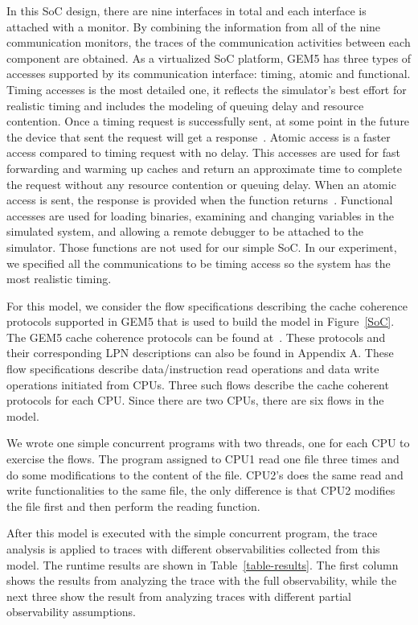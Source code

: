 \documentclass[12pt,frontmatter,copyright,thesis]{usfmanus}
\begin{document}
In this SoC design, there are nine interfaces in total and each 
interface is attached with a monitor.
 By combining the information from all of the nine communication monitors, 
 the traces of the communication activities between each component
 are obtained.
As a virtualized SoC platform, GEM5 has three types of accesses supported by
its communication interface:
timing, atomic and functional.
Timing accesses is the most detailed one,
it reflects the simulator's best effort for realistic timing
and includes the modeling of queuing delay and resource contention.
Once a timing request is successfully sent,
at some point in the future the device that sent the request will get a response~\cite{gem5}. 
Atomic access is a faster access compared to timing request with no delay.  
This accesses are used for fast forwarding and warming up caches and return an approximate time to complete the request without any resource contention or queuing delay.
When an atomic access is sent,
the response is provided when the function returns~\cite{gem5}.
Functional accesses are used for loading binaries, examining and changing variables in the simulated system,
and allowing a remote debugger to be attached to the simulator.
Those functions are not used for
our simple SoC.
In our experiment, we specified all the communications to be timing access
so the system has 
the most realistic timing.


For this model, we consider the flow specifications
describing the cache coherence protocols supported in
GEM5 that is used to build the model in Figure~\ref{SoC}.
The GEM5 cache coherence protocols can be found at~\cite{gem5}.
These protocols and their corresponding LPN descriptions can also be found
in Appendix A.
These flow specifications describe data/instruction read
operations and data write operations initiated from CPUs.
Three such flows describe the cache coherent protocols for
each CPU.  Since there are two CPUs, there are six flows in
the model.



We wrote one simple concurrent programs with two threads, one for each CPU
to exercise the flows.
The program assigned to CPU1 read one file three times and do some modifications to
the content of the file. 
CPU2's does the same read and write functionalities to the same file, the only difference is that CPU2 modifies the file first and then
perform the reading function. 

After this model is executed with the simple concurrent program, 
the trace analysis is applied to traces with different observabilities
collected from this model.  The runtime results are shown in Table~\ref{table-results}.
The first column shows the results from analyzing the trace with the full
observability, while the next three show the result from 
analyzing traces with different partial observability assumptions.
\end{document}
